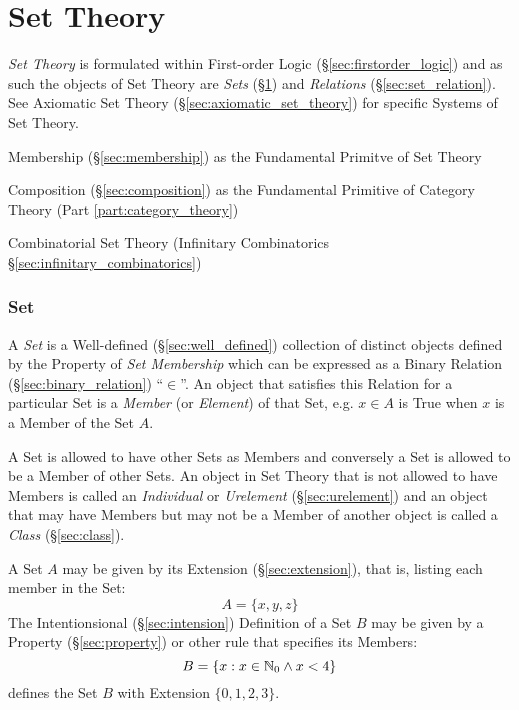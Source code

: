 \part{Set Theory}\label{part:set_theory}

\emph{Set Theory} is formulated within First-order Logic
(\S\ref{sec:firstorder_logic}) and as such the objects of Set Theory
are \emph{Sets} (\S\ref{sec:set}) and \emph{Relations}
(\S\ref{sec:set_relation}). See Axiomatic Set Theory
(\S\ref{sec:axiomatic_set_theory}) for specific Systems of Set Theory.

Membership (\S\ref{sec:membership}) as the Fundamental Primitve of Set
Theory

Composition (\S\ref{sec:composition}) as the Fundamental Primitive of
Category Theory (Part \ref{part:category_theory})

Combinatorial Set Theory (Infinitary Combinatorics
\S\ref{sec:infinitary_combinatorics})



\section{Set}\label{sec:set}

A \emph{Set} is a Well-defined (\S\ref{sec:well_defined}) collection
of distinct objects defined by the Property of \emph{Set Membership}
which can be expressed as a Binary Relation
(\S\ref{sec:binary_relation}) ``$\in$''. An object that satisfies this
Relation for a particular Set is a \emph{Member} (or \emph{Element})
of that Set, e.g. $x \in A$ is True when $x$ is a Member of the Set
$A$.

A Set is allowed to have other Sets as Members and conversely a Set is
allowed to be a Member of other Sets. An object in Set Theory that is
not allowed to have Members is called an \emph{Individual} or
\emph{Urelement} (\S\ref{sec:urelement}) and an object that may have
Members but may not be a Member of another object is called a
\emph{Class} (\S\ref{sec:class}).

A Set $A$ may be given by its Extension (\S\ref{sec:extension}), that
is, listing each member in the Set:
\[
  A = \{x,y,z\}
\]
The Intentionsional (\S\ref{sec:intension}) Definition of a Set $B$
may be given by a Property (\S\ref{sec:property}) or other rule that
specifies its Members:
\[
  B = \{ x : x \in \mathbb{N}_0 \wedge x < 4 \}
\]
defines the Set $B$ with Extension $\{ 0, 1, 2, 3 \}$.

